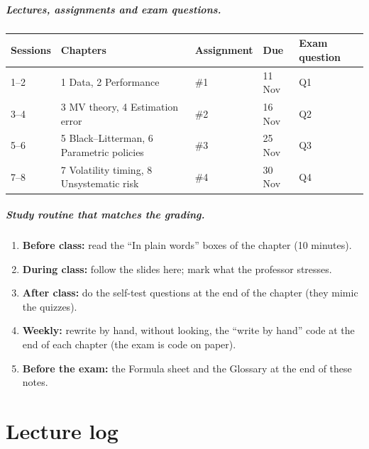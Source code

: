 \documentclass[11pt,a4paper]{report}
\begin{document}
\paragraph{Lectures, assignments and exam questions.}
\begin{center}
\begin{tabular}{@{}lllll@{}}
\toprule
Sessions & Chapters & Assignment & Due & Exam question \\
\midrule
1--2 & 1 Data, 2 Performance & \#1 & 11 Nov & Q1 \\
3--4 & 3 MV theory, 4 Estimation error & \#2 & 16 Nov & Q2 \\
5--6 & 5 Black--Litterman, 6 Parametric policies & \#3 & 25 Nov & Q3 \\
7--8 & 7 Volatility timing, 8 Unsystematic risk & \#4 & 30 Nov & Q4 \\
\bottomrule
\end{tabular}
\end{center}

\paragraph{Study routine that matches the grading.}
\begin{enumerate}
  \item \textbf{Before class:} read the ``In plain words'' boxes of the chapter (10 minutes).
  \item \textbf{During class:} follow the slides here; mark what the professor stresses.
  \item \textbf{After class:} do the self-test questions at the end of the chapter (they mimic the quizzes).
  \item \textbf{Weekly:} rewrite by hand, without looking, the ``write by hand''
    code at the end of each chapter (the exam is code on paper).
  \item \textbf{Before the exam:} the Formula sheet and the Glossary at the end of these notes.
\end{enumerate}



\chapter*{Lecture log}
\end{document}
